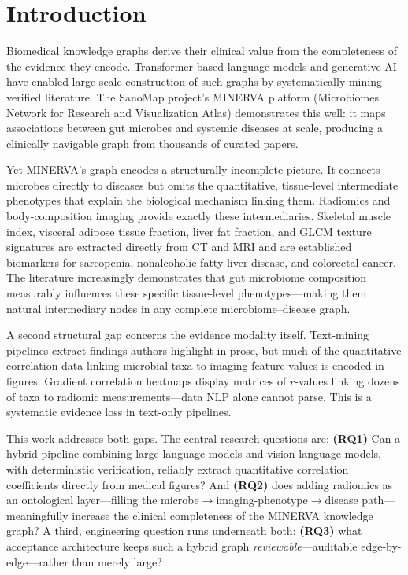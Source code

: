 \documentclass[10pt,twocolumn,letterpaper]{article}
\begin{document}
\section{Introduction}

Biomedical knowledge graphs derive their clinical value from the
completeness of the evidence they encode. Transformer-based language models
and generative AI have enabled large-scale construction of such graphs by
systematically mining verified literature. The SanoMap project's MINERVA
platform (Microbiomes Network for Research and Visualization Atlas)
demonstrates this well: it maps associations between gut microbes and
systemic diseases at scale, producing a clinically navigable graph from
thousands of curated papers.

Yet MINERVA's graph encodes a structurally incomplete picture. It connects
microbes directly to diseases but omits the quantitative, tissue-level
intermediate phenotypes that explain the biological mechanism linking them.
Radiomics and body-composition imaging provide exactly these intermediaries.
Skeletal muscle index, visceral adipose tissue fraction, liver fat fraction,
and GLCM texture signatures are extracted directly from CT and MRI and are
established biomarkers for sarcopenia, nonalcoholic fatty liver disease, and
colorectal cancer. The literature increasingly demonstrates that gut
microbiome composition measurably influences these specific tissue-level
phenotypes---making them natural intermediary nodes in any complete
microbiome--disease graph.

A second structural gap concerns the evidence modality itself. Text-mining
pipelines extract findings authors highlight in prose, but much of the
quantitative correlation data linking microbial taxa to imaging feature
values is encoded in figures. Gradient correlation heatmaps display matrices
of $r$-values linking dozens of taxa to radiomic measurements---data NLP
alone cannot parse. This is a systematic evidence loss in text-only
pipelines.

This work addresses both gaps. The central research questions are:
\textbf{(RQ1)} Can a hybrid pipeline combining large language models and
vision-language models, with deterministic verification, reliably extract
quantitative correlation coefficients directly from medical figures? And
\textbf{(RQ2)} does adding radiomics as an ontological layer---filling the
microbe$\rightarrow$imaging-phenotype$\rightarrow$disease path---meaningfully
increase the clinical completeness of the MINERVA knowledge graph? A third,
engineering question runs underneath both: \textbf{(RQ3)} what acceptance
architecture keeps such a hybrid graph \emph{reviewable}---auditable
edge-by-edge---rather than merely large?
\end{document}
